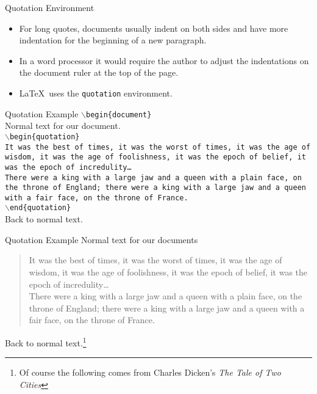 \documentclass[pdf]{prosper}
\begin{document}
\begin{slide}{Quotation Environment}
	\begin{itemize}
		\item For long quotes, documents usually indent on both sides and have more indentation for the beginning of a new paragraph.
		\item In a word processor it would require the author to adjust the indentations on the document ruler at the top of the page.
		\item \LaTeX\ uses the \texttt{quotation} environment.
	\end{itemize}
\end{slide}
\begin{slide}{Quotation Example}
	\texttt{$\backslash$begin\{document\}} \\
	Normal text for our document. \\
	\texttt{$\backslash$begin\{quotation\}} \\
	\texttt{It was the best of times, it was the worst of times, it was the age of wisdom, it was the age of foolishness, it was the epoch of belief, it was the epoch of incredulity\ldots} \\

	\texttt{There were a king with a large jaw and a queen with a plain face, on the throne of England; there were a king with a large jaw and a queen with a fair face, on the throne of France.} \\
	\texttt{$\backslash$end\{quotation\}} \\
	Back to normal text.
\end{slide}
\begin{slide}{Quotation Example}
	Normal text for our documents \\
	\begin{quotation}
	It was the best of times, it was the worst of times, it was the age of wisdom, it was the age of foolishness, it was the epoch of belief, it was the epoch of incredulity\ldots \\

	There were a king with a large jaw and a queen with a plain face, on the throne of England; there were a king with a large jaw and a queen with a fair face, on the throne of France. \\
	\end{quotation}
	Back to normal text.\footnote{Of course the following comes from Charles Dicken's \textit{The Tale of Two Cities}}
\end{slide}
\end{document}
